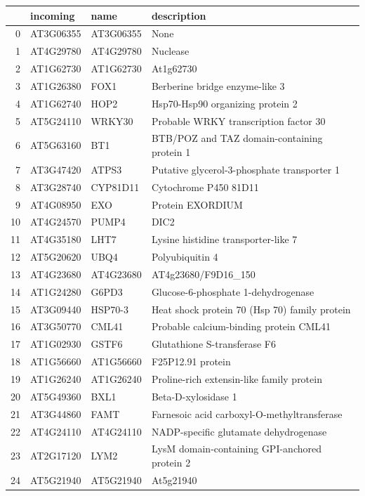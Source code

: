 \documentclass[11pt]{article}
\begin{document}
\begin{center}
\begin{tabular}{rlll}
 & incoming & name & description\\
\hline
0 & AT3G06355 & AT3G06355 & None\\
1 & AT4G29780 & AT4G29780 & Nuclease\\
2 & AT1G62730 & AT1G62730 & At1g62730\\
3 & AT1G26380 & FOX1 & Berberine bridge enzyme-like 3\\
4 & AT1G62740 & HOP2 & Hsp70-Hsp90 organizing protein 2\\
5 & AT5G24110 & WRKY30 & Probable WRKY transcription factor 30\\
6 & AT5G63160 & BT1 & BTB/POZ and TAZ domain-containing protein 1\\
7 & AT3G47420 & ATPS3 & Putative glycerol-3-phosphate transporter 1\\
8 & AT3G28740 & CYP81D11 & Cytochrome P450 81D11\\
9 & AT4G08950 & EXO & Protein EXORDIUM\\
10 & AT4G24570 & PUMP4 & DIC2\\
11 & AT4G35180 & LHT7 & Lysine histidine transporter-like 7\\
12 & AT5G20620 & UBQ4 & Polyubiquitin 4\\
13 & AT4G23680 & AT4G23680 & AT4g23680/F9D16\_150\\
14 & AT1G24280 & G6PD3 & Glucose-6-phosphate 1-dehydrogenase\\
15 & AT3G09440 & HSP70-3 & Heat shock protein 70 (Hsp 70) family protein\\
16 & AT3G50770 & CML41 & Probable calcium-binding protein CML41\\
17 & AT1G02930 & GSTF6 & Glutathione S-transferase F6\\
18 & AT1G56660 & AT1G56660 & F25P12.91 protein\\
19 & AT1G26240 & AT1G26240 & Proline-rich extensin-like family protein\\
20 & AT5G49360 & BXL1 & Beta-D-xylosidase 1\\
21 & AT3G44860 & FAMT & Farnesoic acid carboxyl-O-methyltransferase\\
22 & AT4G24110 & AT4G24110 & NADP-specific glutamate dehydrogenase\\
23 & AT2G17120 & LYM2 & LysM domain-containing GPI-anchored protein 2\\
24 & AT5G21940 & AT5G21940 & At5g21940\\
\end{tabular}
\end{center}
\end{document}
